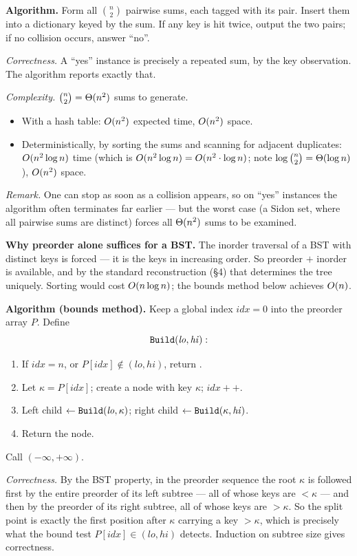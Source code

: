 \textbf{Algorithm.} Form all $\binom n2$ pairwise sums, each tagged with its pair. Insert them
into a dictionary keyed by the sum. If any key is hit twice, output the two pairs; if no
collision occurs, answer ``no''.

\emph{Correctness.} A ``yes'' instance is precisely a repeated sum, by the key observation. The
algorithm reports exactly that.

\emph{Complexity.} $\binom n2=\Theta(n^2)$ sums to generate.
\begin{itemize}
  \item With a hash table: $O(n^2)$ expected time, $O(n^2)$ space.
  \item Deterministically, by sorting the sums and scanning for adjacent duplicates:
        $O(n^2\log n)$ time (which is $O(n^2\log n)=O(n^2\cdot\log n)$; note
        $\log\binom n2=\Theta(\log n)$), $O(n^2)$ space.
\end{itemize}
\emph{Remark.} One can stop as soon as a collision appears, so on ``yes'' instances the algorithm
often terminates far earlier --- but the worst case (a Sidon set, where all pairwise sums are
distinct) forces all $\Theta(n^2)$ sums to be examined.

\textbf{Why preorder alone suffices for a BST.} The inorder traversal of a BST with distinct keys
is forced --- it is the keys in increasing order. So preorder $+$ inorder is available, and by the
standard reconstruction (\S4) that determines the tree uniquely. Sorting would cost
$O(n\log n)$; the bounds method below achieves $O(n)$.

\textbf{Algorithm (bounds method).} Keep a global index $\mathit{idx}=0$ into the preorder array
$P$. Define
\[
  \texttt{Build}(\mathit{lo},\mathit{hi}):
\]
\begin{enumerate}
  \item If $\mathit{idx}=n$, or $P[\mathit{idx}]\notin(\mathit{lo},\mathit{hi})$, return
        .
  \item Let $\kappa=P[\mathit{idx}]$; create a node with key $\kappa$; $\mathit{idx}{+}{+}$.
  \item Left child $\leftarrow\texttt{Build}(\mathit{lo},\kappa)$;
        right child $\leftarrow\texttt{Build}(\kappa,\mathit{hi})$.
  \item Return the node.
\end{enumerate}
Call $(-\infty,+\infty)$.

\emph{Correctness.} By the BST property, in the preorder sequence the root $\kappa$ is followed
first by the entire preorder of its left subtree --- all of whose keys are $<\kappa$ --- and then
by the preorder of its right subtree, all of whose keys are $>\kappa$. So the split point is
exactly the first position after $\kappa$ carrying a key $>\kappa$, which is precisely what the
bound test $P[\mathit{idx}]\in(\mathit{lo},\mathit{hi})$ detects. Induction on subtree size gives
correctness.

